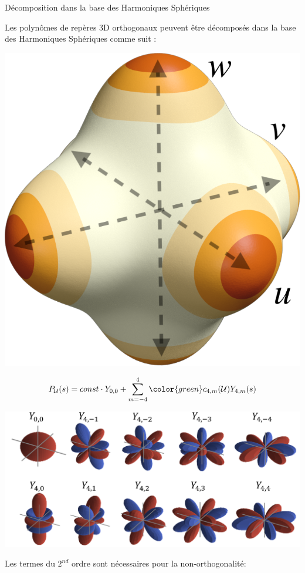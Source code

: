 \documentclass{beamer}
\begin{document}
\begin{frame}{Décomposition dans la base des Harmoniques Sphériques}
    \centering
    \begin{overprint}
     \centering
    \small
    Les polynômes de repères 3D orthogonaux peuvent être décomposés dans la base des Harmoniques Sphériques comme suit :\\
    \begin{minipage}[c]{0.24\textwidth}
        \centering
          \vspace*{.5\baselineskip}
          \hfill
        \includegraphics[width=0.6\linewidth]{img_spm_ff/sperical_3dir4.png}
    \end{minipage}
    \begin{minipage}[c]{0.74\textwidth}
        $$P_\mathcal{U}(s) = const \cdot Y_{0, 0} + \sum_{m = -4}^4{{\color{green}c_{4, m}(\mathcal{U})}Y_{4,m}(s)}$$ 
    \end{minipage}
    
    \vspace*{.5\baselineskip}
    \includegraphics[width=.8\linewidth]{img_spm_ff/ortho_harmonic_decompo.PNG} 
    
     \centering
    
    \small
    Les termes du $2^{nd}$ ordre sont nécessaires pour la non-orthogonalité:
    

\end{overprint}
\end{frame}
\end{document}
